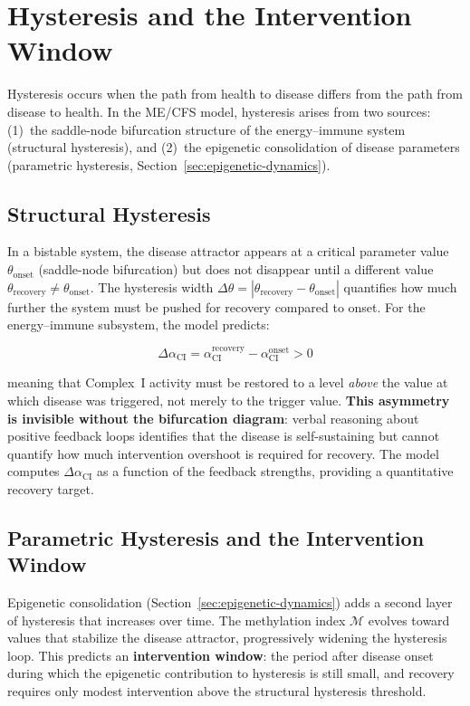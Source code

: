 \section{Hysteresis and the Intervention Window}
\label{sec:hysteresis-analysis}

Hysteresis occurs when the path from health to disease differs from the path from disease to health. In the ME/CFS model, hysteresis arises from two sources: (1)~the saddle-node bifurcation structure of the energy--immune system (structural hysteresis), and (2)~the epigenetic consolidation of disease parameters (parametric hysteresis, Section~\ref{sec:epigenetic-dynamics}).

\subsection{Structural Hysteresis}

In a bistable system, the disease attractor appears at a critical parameter value $\theta_{\text{onset}}$ (saddle-node bifurcation) but does not disappear until a different value $\theta_{\text{recovery}} \neq \theta_{\text{onset}}$. The hysteresis width $\Delta\theta = |\theta_{\text{recovery}} - \theta_{\text{onset}}|$ quantifies how much further the system must be pushed for recovery compared to onset. For the energy--immune subsystem, the model predicts:

\begin{equation}
\label{eq:hysteresis-width}
\Delta\alpha_{\text{CI}} = \alpha_{\text{CI}}^{\text{recovery}} - \alpha_{\text{CI}}^{\text{onset}} > 0
\end{equation}

meaning that Complex~I activity must be restored to a level \emph{above} the value at which disease was triggered, not merely to the trigger value. \textbf{This asymmetry is invisible without the bifurcation diagram}: verbal reasoning about positive feedback loops identifies that the disease is self-sustaining but cannot quantify how much intervention overshoot is required for recovery. The model computes $\Delta\alpha_{\text{CI}}$ as a function of the feedback strengths, providing a quantitative recovery target.

\subsection{Parametric Hysteresis and the Intervention Window}

Epigenetic consolidation (Section~\ref{sec:epigenetic-dynamics}) adds a second layer of hysteresis that increases over time. The methylation index $\mathcal{M}$ evolves toward values that stabilize the disease attractor, progressively widening the hysteresis loop. This predicts an \textbf{intervention window}: the period after disease onset during which the epigenetic contribution to hysteresis is still small, and recovery requires only modest intervention above the structural hysteresis threshold.

